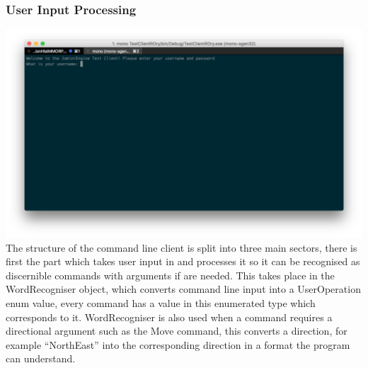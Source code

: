 \documentclass{article}
\begin{document}
\subsubsection{User Input Processing}
\includegraphics[width=\textwidth]{text1.png}
The structure of the command line client is split into three main sectors, there is first the part which takes user input in and processes it so it can be recognised as discernible commands with arguments if are needed. This takes place in the WordRecogniser object, which converts command line input into a UserOperation enum value, every command has a value in this enumerated type which corresponds to it. WordRecogniser is also used when a command requires a directional argument such as the Move command, this converts a direction, for example “NorthEast” into the corresponding direction in a format the program can understand.
\end{document}
